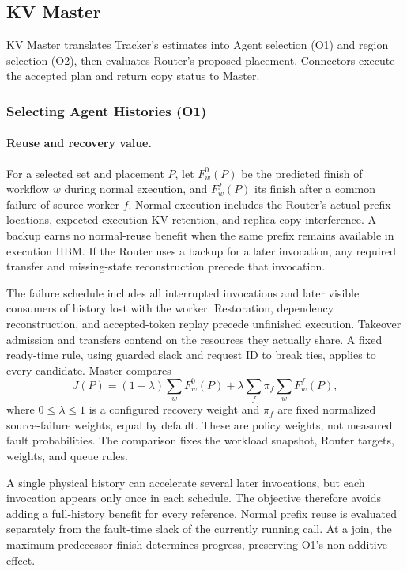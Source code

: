 \subsection{KV Master}
\label{sec:teacher-master}

KV Master translates Tracker's estimates into Agent selection (O1)
and region selection (O2), then evaluates Router's proposed placement.
Connectors execute the accepted plan and return copy status to Master.

\subsubsection{Selecting Agent Histories (O1)}
\label{sec:teacher-agent-protection}

\paragraph{Reuse and recovery value.}
For a selected set and placement $P$, let $F_w^0(P)$ be the predicted
finish of workflow $w$ during normal execution, and $F_w^f(P)$ its finish
after a common failure of source worker $f$. Normal execution includes
the Router's actual prefix locations, expected execution-KV retention,
and replica-copy interference. A backup earns no normal-reuse benefit
when the same prefix remains available in execution HBM. If the Router
uses a backup for a later invocation, any required transfer and
missing-state reconstruction precede that invocation.

The failure schedule includes all interrupted invocations and later
visible consumers of history lost with the worker. Restoration,
dependency reconstruction, and accepted-token replay precede unfinished
execution. Takeover admission and transfers contend on the resources
they actually share. A fixed ready-time rule, using guarded slack and
request ID to break ties, applies to every candidate. Master compares
\begin{equation}
 J(P)=(1-\lambda)\sum_w F_w^0(P)
       +\lambda\sum_f\pi_f\sum_w F_w^f(P),
 \label{eq:teacher-objective}
\end{equation}
where $0\le\lambda\le1$ is a configured recovery weight and $\pi_f$ are
fixed normalized source-failure weights, equal by default. These are
policy weights, not measured fault probabilities. The comparison fixes
the workload snapshot, Router targets, weights, and queue rules.

A single physical history can accelerate several later invocations,
but each invocation appears only once in each schedule. The objective
therefore avoids adding a full-history benefit for every reference.
Normal prefix reuse is evaluated separately from the fault-time slack
of the currently running call. At a join, the maximum predecessor
finish determines progress, preserving O1's non-additive effect.

